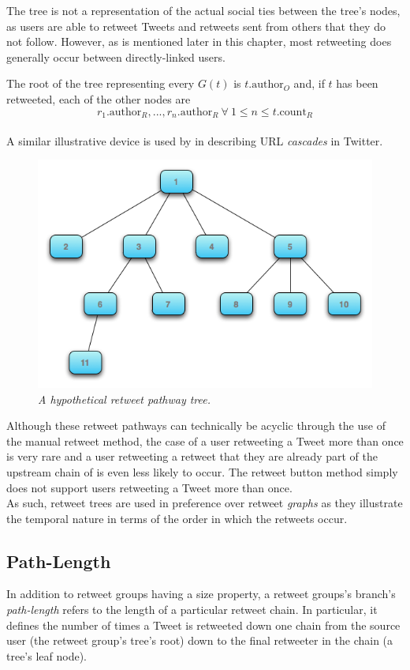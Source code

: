 The tree is not a representation of the actual social ties between the tree's nodes, as users are able to retweet Tweets and retweets sent from others that they do not follow. However, as is mentioned later in this chapter, most retweeting does generally occur between directly-linked users.

The root of the tree representing every $G(t)$ is $t.\textrm{author}_O$ and, if $t$ has been retweeted, each of the other nodes are $$r_1.\textrm{author}_R, ... , r_n.\textrm{author}_R \: \forall \: 1 \leq n \leq t.\mathrm{count}_R $$\\
A similar illustrative device is used by \cite{galuba10} in describing URL \textit{cascades} in Twitter.

\begin{figure}[h]
\centering
\includegraphics[scale=0.5]{3.Chapter1/Media/tree.png} 
\caption{\textit{A hypothetical retweet pathway tree.}}
\label{fig:retweet_tree}
\end{figure}

Although these retweet pathways can technically be acyclic through the use of the manual retweet method, the case of a user retweeting a Tweet more than once is very rare and a user retweeting a retweet that they are already part of the upstream chain of is even less likely to occur. The retweet button method simply does not support users retweeting a Tweet more than once.\\
As such, retweet trees are used in preference over retweet \textit{graphs} as they illustrate the temporal nature in terms of the order in which the retweets occur.


\subsection{Path-Length}
In addition to retweet groups having a size property, a retweet groups's branch's \textit{path-length} refers to the length of a particular retweet chain. In particular, it defines the number of times a Tweet is retweeted down one chain from the source user (the retweet group's tree's root) down to the final retweeter in the chain (a tree's leaf node).

